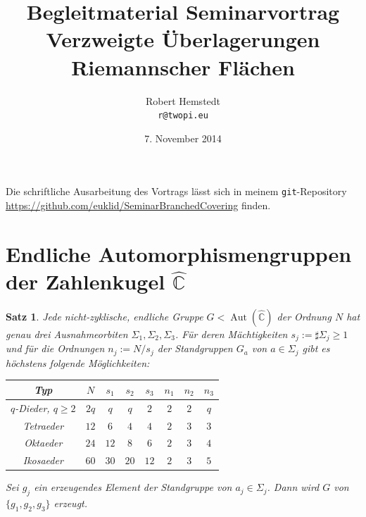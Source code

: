 \documentclass[12pt,a4paper]{article}
\author{Robert Hemstedt \\ \texttt{r@twopi.eu}}
\date{7. November 2014}
\title{Begleitmaterial Seminarvortrag Verzweigte Überlagerungen Riemannscher Flächen}
\theoremstyle{plain}
\newtheorem*{Satz}[Theorem]{Satz}
\newcommand{\C}{\mathbb{C}}
\newcommand{\Ch}{\hat{\C}}
\numberwithin{equation}{section}
\begin{document}
\maketitle
Die schriftliche Ausarbeitung des Vortrags lässt sich in meinem \texttt{git}-Repository \linebreak \url{https://github.com/euklid/SeminarBranchedCovering} finden.
\section*{Endliche Automorphismengruppen der Zahlenkugel $\hat{\C}$}
\begin{Satz}
Jede nicht-zyklische, endliche Gruppe $G < \operatorname{Aut}(\Ch)$ der Ordnung $N$ hat genau drei Ausnahmeorbiten $\Sigma_1,\Sigma_2,\Sigma_3$. Für deren Mächtigkeiten $s_j :=\sharp\Sigma_j \geq 1$ und für die Ordnungen $n_j:=N/s_j$ der Standgruppen $G_a$ von $a\in \Sigma_j$ gibt es höchstens folgende Möglichkeiten: \begin{center}
\begin{tabular}{|c|c|c|c|c|c|c|c|} \hline
Typ & $N$ & $s_1$ & $s_2$ & $s_3$ & $n_1$ & $n_2$ & $n_3$ \\\hline
$q$-Dieder, $q\geq 2$ & $2q$ & $q$ & $q$ & $2$ & $2$ & $2$ & $q$ \\\hline
Tetraeder & $12$ & $6$ & $4$ & $4$ & $2$ & $3$ & $3$ \\\hline
Oktaeder & $24$ & $12$ & $8$ & $6$ & $2$ & $3$ & $4$ \\\hline
Ikosaeder & $60$ & $30$ & $20$ & $12$ & $2$ & $3$ & $5$ \\\hline
\end{tabular}
\end{center}
Sei $g_j$ ein erzeugendes Element der Standgruppe von $a_j \in \Sigma_j$. Dann wird $G$ von $\{g_1, g_2, g_3\}$ erzeugt. 
\end{Satz}
\end{document}
